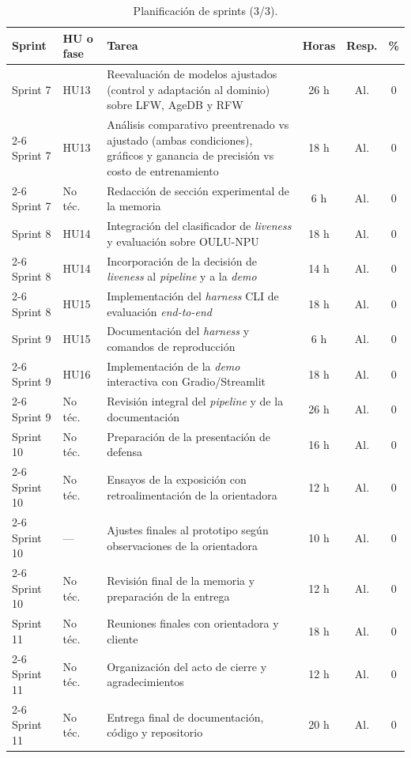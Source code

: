 \documentclass[
  11pt, %
]{charter}
\begin{document}
\begin{table}[htpb]
  \centering
  \caption{Planificación de sprints (3/3).}
  \begin{tabularx}{\linewidth}{@{}|l|X|X|c|c|c|@{}}
    \hline
    \rowcolor[HTML]{C0C0C0}
    Sprint & HU o fase & Tarea & Horas & Resp. & \% \\ \hline

    Sprint 7 & HU13 & Reevaluación de modelos ajustados (control y adaptación al dominio) sobre LFW, AgeDB y RFW & 26 h & Al. & 0 \\ \cline{2-6}
    Sprint 7 & HU13 & Análisis comparativo preentrenado vs ajustado (ambas condiciones), gráficos y ganancia de precisión vs costo de entrenamiento & 18 h & Al. & 0 \\ \cline{2-6}
    Sprint 7 & No téc. & Redacción de sección experimental de la memoria & 6 h & Al. & 0 \\ \hline

    Sprint 8 & HU14 & Integración del clasificador de \textit{liveness} y evaluación sobre OULU-NPU & 18 h & Al. & 0 \\ \cline{2-6}
    Sprint 8 & HU14 & Incorporación de la decisión de \textit{liveness} al \textit{pipeline} y a la \textit{demo} & 14 h & Al. & 0 \\ \cline{2-6}
    Sprint 8 & HU15 & Implementación del \textit{harness} CLI de evaluación \textit{end-to-end} & 18 h & Al. & 0 \\ \hline

    Sprint 9 & HU15 & Documentación del \textit{harness} y comandos de reproducción & 6 h & Al. & 0 \\ \cline{2-6}
    Sprint 9 & HU16 & Implementación de la \textit{demo} interactiva con Gradio/Streamlit & 18 h & Al. & 0 \\ \cline{2-6}
    Sprint 9 & No téc. & Revisión integral del \textit{pipeline} y de la documentación & 26 h & Al. & 0 \\ \hline

    Sprint 10 & No téc. & Preparación de la presentación de defensa & 16 h & Al. & 0 \\ \cline{2-6}
    Sprint 10 & No téc. & Ensayos de la exposición con retroalimentación de la orientadora & 12 h & Al. & 0 \\ \cline{2-6}
    Sprint 10 & --- & Ajustes finales al prototipo según observaciones de la orientadora & 10 h & Al. & 0 \\ \cline{2-6}
    Sprint 10 & No téc. & Revisión final de la memoria y preparación de la entrega & 12 h & Al. & 0 \\ \hline

    Sprint 11 & No téc. & Reuniones finales con orientadora y cliente & 18 h & Al. & 0 \\ \cline{2-6}
    Sprint 11 & No téc. & Organización del acto de cierre y agradecimientos & 12 h & Al. & 0 \\ \cline{2-6}
    Sprint 11 & No téc. & Entrega final de documentación, código y repositorio & 20 h & Al. & 0 \\ \hline

  \end{tabularx}
\end{table}
\end{document}
